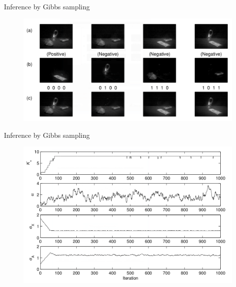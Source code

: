 \documentclass[13pt]{beamer}
\begin{document}
\begin{frame}{Inference by Gibbs sampling} 
\begin{figure}
\begin{center}
    \includegraphics[scale=0.4]{./img/ibp-inference-reconstruction.png}
\end{center}
\end{figure}   
\end{frame}
\begin{frame}{Inference by Gibbs sampling} 
\begin{figure}
\begin{center}
    \includegraphics[scale=0.4]{./img/ibp-inference-example.png}
\end{center}
\end{figure}   
\end{frame}
\end{document}
